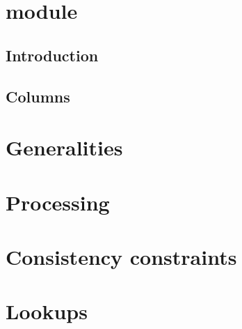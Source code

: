 
\section{\blockHashMod{} module}
\subsection{Introduction}                    \label{block hash: intro}                    
\subsection{Columns}                         \label{block hash: columns}                  

\section{Generalities}                       \label{block hash: generalities}             
\section{Processing}                         \label{block hash: processing}               
\section{Consistency constraints}            \label{block hash: consistency}              
\section{Lookups}                            \label{block hash  lookups}                  
